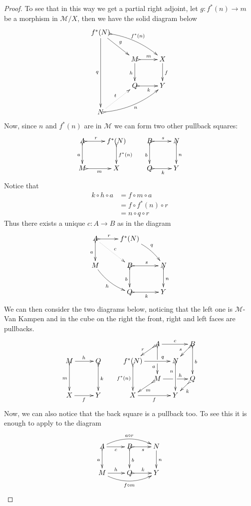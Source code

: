 \documentclass[a4paper]{article}
\def\X{\textbf {\textup{X}}}
\theoremstyle{definition}
\begin{document}
\begin{proof}
To see that in this way we get a partial right adjoint, let $g\colon f^*(n)\to m $ be a morphism in $\mathcal{M}/X$, then we have the solid diagram below
\[\xymatrix{f^*(N) \ar[dr]^{g} \ar@{>->}@/^.3cm/[drr]^{f^*(n)} \ar[ddd]_{q}\\& M \ar@{>->}[r]^{m}\ar[d]_{h}& X \ar[d]^f \\&Q\ar@{>->}[r]_{k}&Y\\N \ar@{>->}@/_.3cm/[urr]_{n} \ar@{.>}[ur]^{t}}\]
Now, since $n$ and $f^*(n)$ are in $\mathcal{M}$ we can form two other pullback squares:
\[\xymatrix{A \ar@{>->}[d]_{a}\ar@{>->}[r]^-{r}& f^*(N) \ar@{>->}[d]^{f^*(n)} & B \ar@{>->}[r]^{s} \ar@{>->}[d]_{b}& N \ar@{>->}[d]^{n}\\M \ar@{>->}[r]_{m}&X &Q \ar@{>->}[r]_k&Y\\}\]
Notice that 
\begin{align*}
	k\circ h\circ a&=f\circ m\circ a\\&=f\circ f^*(n)\circ r\\&=n\circ q \circ r
\end{align*}
Thus there exists a unique $c\colon A\to B$ as in the diagram
\[\xymatrix{A \ar@{>->}[d]_{a} \ar@{.>}[dr]^{c}\ar@{>->}[r]^-{r} &f^*(N) \ar@/^.2cm/[dr]^{q} \\ M \ar@/_.2cm/[dr]_{h}&B\ar@{>->}[r]^{s}  \ar@{>->}[d]_{b}& N \ar@{>->}[d]^{n}\\ &Q \ar@{>->}[r]_{k} & Y}\]
We can then consider the two diagrams below, noticing that the left one is $\mathcal{M}$-Van Kampen and in the cube on the right the front, right and left faces are pullbacks.
		\[\xymatrix@C=10pt@R=10pt{&&&&&A\ar@{>->}[dd]|\hole_(.65){a}\ar[rr]^{c} \ar@{>->}[dl]_{r} && B \ar@{>->}[dd]^{b} \ar@{>->}[dl]_{s} \\ M \ar@{>->}[dd]_{m}\ar[rr]^{h}&&Q\ar@{>->}[dd]^{k}&&f^*(N)  \ar@{>->}[dd]_{f^*(n)}\ar[rr]^(.7){q} & & N \ar@{>->}[dd]_(.3){n}\\&&&&&M\ar[rr]|\hole^(.65){h} \ar@{>->}[dl]^{m} && Q \ar@{>->}[dl]^{k} \\X\ar[rr]_{f} &&Y&&X \ar[rr]_{f} & & Y}\]
Now, we can also notice that the back square is a pullback too. To see this it is enough to apply  to the diagram
\[\xymatrix{A  \ar@/^.4cm/[rr]^{a\circ r}\ar@{>->}[d]_{a} \ar[r]_{c}& \ar@{>->}[r]_{s}B \ar@{>->}[d]^{b}& N \ar[d]^{n}\\ M \ar@/_.4cm/[rr]_{f\circ m}\ar[r]^{h}& Q \ar@{>->}[r]^{k}& Y}\]


\end{proof}
\end{document}
